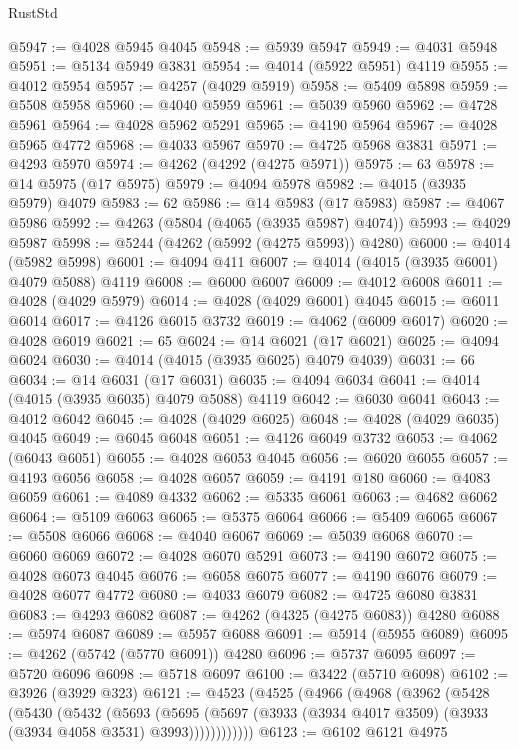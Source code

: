 \begin{lexlean}{RustStd}
\begin{coremodule}
@5947 := @4028 @5945 @4045
@5948 := @5939 @5947
@5949 := @4031 @5948
@5951 := @5134 @5949 @3831
@5954 := @4014 (@5922 @5951) @4119
@5955 := @4012 @5954
@5957 := @4257 (@4029 @5919)
@5958 := @5409 @5898
@5959 := @5508 @5958
@5960 := @4040 @5959
@5961 := @5039 @5960
@5962 := @4728 @5961
@5964 := @4028 @5962 @5291
@5965 := @4190 @5964
@5967 := @4028 @5965 @4772
@5968 := @4033 @5967
@5970 := @4725 @5968 @3831
@5971 := @4293 @5970
@5974 := @4262 (@4292 (@4275 @5971))
@5975 := 63
@5978 := @14 @5975 (@17 @5975)
@5979 := @4094 @5978
@5982 := @4015 (@3935 @5979) @4079
@5983 := 62
@5986 := @14 @5983 (@17 @5983)
@5987 := @4067 @5986
@5992 := @4263 (@5804 (@4065 (@3935 @5987) @4074))
@5993 := @4029 @5987
@5998 := @5244 (@4262 (@5992 (@4275 @5993)) @4280)
@6000 := @4014 (@5982 @5998)
@6001 := @4094 @411
@6007 := @4014 (@4015 (@3935 @6001) @4079 @5088) @4119
@6008 := @6000 @6007
@6009 := @4012 @6008
@6011 := @4028 (@4029 @5979)
@6014 := @4028 (@4029 @6001) @4045
@6015 := @6011 @6014
@6017 := @4126 @6015 @3732
@6019 := @4062 (@6009 @6017)
@6020 := @4028 @6019
@6021 := 65
@6024 := @14 @6021 (@17 @6021)
@6025 := @4094 @6024
@6030 := @4014 (@4015 (@3935 @6025) @4079 @4039)
@6031 := 66
@6034 := @14 @6031 (@17 @6031)
@6035 := @4094 @6034
@6041 := @4014 (@4015 (@3935 @6035) @4079 @5088) @4119
@6042 := @6030 @6041
@6043 := @4012 @6042
@6045 := @4028 (@4029 @6025)
@6048 := @4028 (@4029 @6035) @4045
@6049 := @6045 @6048
@6051 := @4126 @6049 @3732
@6053 := @4062 (@6043 @6051)
@6055 := @4028 @6053 @4045
@6056 := @6020 @6055
@6057 := @4193 @6056
@6058 := @4028 @6057
@6059 := @4191 @180
@6060 := @4083 @6059
@6061 := @4089 @4332
@6062 := @5335 @6061
@6063 := @4682 @6062
@6064 := @5109 @6063
@6065 := @5375 @6064
@6066 := @5409 @6065
@6067 := @5508 @6066
@6068 := @4040 @6067
@6069 := @5039 @6068
@6070 := @6060 @6069
@6072 := @4028 @6070 @5291
@6073 := @4190 @6072
@6075 := @4028 @6073 @4045
@6076 := @6058 @6075
@6077 := @4190 @6076
@6079 := @4028 @6077 @4772
@6080 := @4033 @6079
@6082 := @4725 @6080 @3831
@6083 := @4293 @6082
@6087 := @4262 (@4325 (@4275 @6083)) @4280
@6088 := @5974 @6087
@6089 := @5957 @6088
@6091 := @5914 (@5955 @6089)
@6095 := @4262 (@5742 (@5770 @6091)) @4280
@6096 := @5737 @6095
@6097 := @5720 @6096
@6098 := @5718 @6097
@6100 := @3422 (@5710 @6098)
@6102 := @3926 (@3929 @323)
@6121 := @4523
    (@4525
      (@4966
        (@4968
          (@3962
            (@5428
              (@5430
                (@5432
                  (@5693
                    (@5695
                      (@5697 (@3933 (@3934 @4017 @3509) (@3933 (@3934 @4058 @3531) @3993))))))))))))
@6123 := @6102 @6121 @4975

\end{coremodule}
\end{lexlean}
